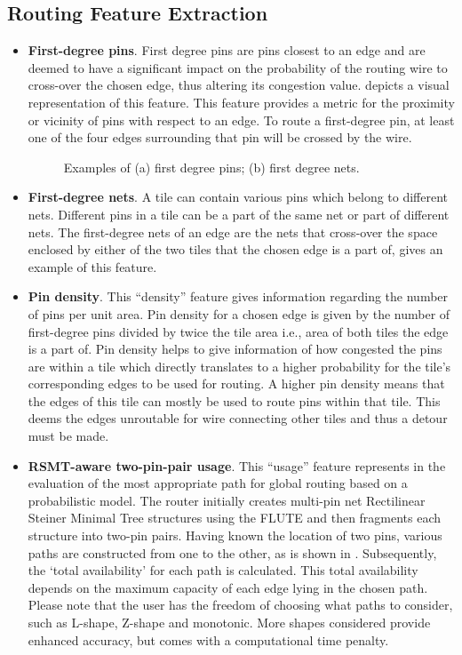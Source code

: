 \subsection{Routing Feature Extraction}
\begin{itemize}
\item \textbf{First-degree pins}. First degree pins are pins closest to an edge and are deemed to have a significant impact on the probability of the routing wire to cross-over the chosen edge, thus altering its congestion value.  depicts a visual representation of this feature. This feature provides a metric for the proximity or vicinity of pins with respect to an edge. To route a first-degree pin, at least one of the four edges surrounding that pin will be crossed by the wire.

\begin{figure}[tb!]
    \centering
    \caption{Examples of (a) first degree pins; (b) first degree nets.}
\end{figure}

\item \textbf{First-degree nets}. A tile can contain various pins which belong to different nets. Different pins in a tile can be a part of the same net or part of different nets. The first-degree nets of an edge are the nets that cross-over the space enclosed by either of the two tiles that the chosen edge is a part of,   gives an example of this feature. 

\item \textbf{Pin density}. This ``density'' feature gives information regarding the number of pins per unit area. Pin density for a chosen edge is given by the number of first-degree pins divided by twice the tile area i.e., area of both tiles the edge is a part of. Pin density helps to give information of how congested the pins are within a tile which directly translates to a higher probability for the tile's corresponding edges to be used for routing. A higher pin density means that the edges of this tile can mostly be used to route pins within that tile. This deems the edges unroutable for wire connecting other tiles and thus a detour must be made. 

\item \textbf{RSMT-aware two-pin-pair usage}. This ``usage'' feature represents in the evaluation of the most appropriate path for global routing based on a probabilistic model. The router initially creates multi-pin net Rectilinear Steiner Minimal Tree structures using the FLUTE \cite{FLUTE} and then fragments each structure into two-pin pairs. Having known the location of two pins, various paths are constructed from one to the other, as is shown in . Subsequently, the ‘total availability’ for each path is calculated. This total availability depends on the maximum capacity of each edge lying in the chosen path. Please note that the user has the freedom of choosing what paths to consider, such as L-shape, Z-shape and monotonic. More shapes considered provide enhanced accuracy, but comes with a computational time penalty.


\end{itemize}
